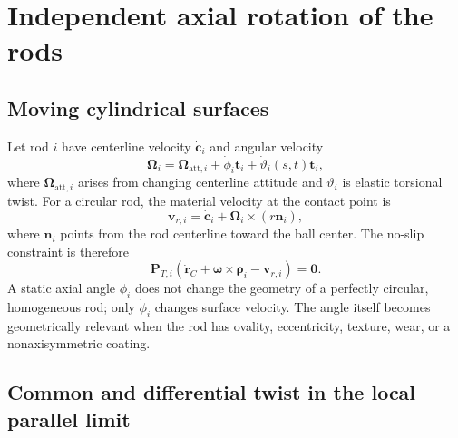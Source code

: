 \documentclass[11pt]{article}
\numberwithin{equation}{section}
\theoremstyle{definition}
\theoremstyle{remark}
\begin{document}
\section{Independent axial rotation of the rods}
\label{sec:rodrotation}

\subsection{Moving cylindrical surfaces}

Let rod $i$ have centerline velocity $\dot{\bm c}_i$ and angular velocity
\begin{equation}
  \bm\Omega_i
  =\bm\Omega_{\mathrm{att},i}
   +\dot\phi_i\bm t_i
   +\dot\vartheta_i(s,t)\bm t_i,
  \label{eq:rodangularvelocity}
\end{equation}
where $\bm\Omega_{\mathrm{att},i}$ arises from changing centerline attitude and $\vartheta_i$ is elastic torsional twist.  For a circular rod, the material velocity at the contact point is
\begin{equation}
  \bm v_{r,i}
  =\dot{\bm c}_i
   +\bm\Omega_i\times(r\bm n_i),
  \label{eq:rodsurfacevelocity}
\end{equation}
where $\bm n_i$ points from the rod centerline toward the ball center.  The no-slip constraint is therefore
\begin{equation}
  \bm P_{T,i}
  \left(
  \dot{\bm r}_C+\bm\omega\times\bm\rho_i-\bm v_{r,i}
  \right)=\bm0.
  \label{eq:movingsurfacenoslip}
\end{equation}
A static axial angle $\phi_i$ does not change the geometry of a perfectly circular, homogeneous rod; only $\dot\phi_i$ changes surface velocity.  The angle itself becomes geometrically relevant when the rod has ovality, eccentricity, texture, wear, or a nonaxisymmetric coating.

\subsection{Common and differential twist in the local parallel limit}
\end{document}
